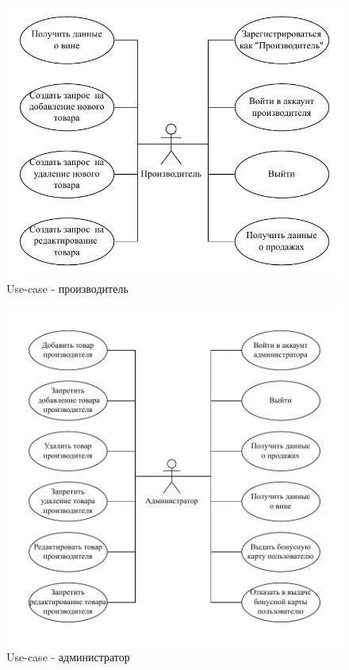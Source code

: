 \begin{figure}[H]
	\begin{center}
		\includegraphics[scale=0.8]{img/manufacturer.pdf}
	\end{center}
	\captionsetup{justification=centering}
	\caption{Use-case - производитель}
	\label{img:manufacturer}
\end{figure}

\begin{figure}[H]
	\begin{center}
		\includegraphics[scale=0.8]{img/administrator.pdf}
	\end{center}
	\captionsetup{justification=centering}
	\caption{Use-case - администратор}
	\label{img:administrator}
\end{figure}